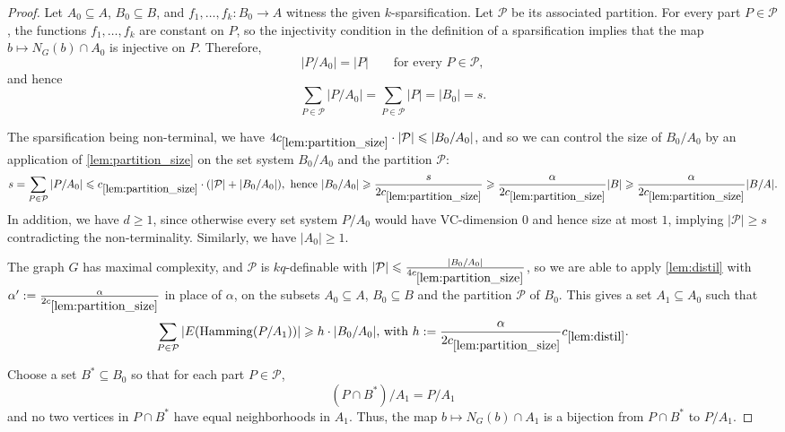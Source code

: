 \documentclass[11pt]{article}
\theoremstyle{definition}
\newcommand{\inducedSS}[2]{#1/#2}%
\renewcommand{\le}{\leqslant}
\renewcommand{\ge}{\geqslant}
\newcommand{\from}{\colon}
\renewcommand{\cal}{\mathcal}
\newcommand{\Pp}{\mathcal{P}}
\newcommand{\hamming}{\mathrm{Hamming}}
\begin{document}
\begin{proof}
Let $A_0\subseteq A$, $B_0\subseteq B$, and $f_1,\ldots,f_k\from B_0\to A$
witness the given $k$-sparsification.
Let $\cal P$ be its associated partition.
For every part $P\in\cal P$, the functions $f_1,\ldots,f_k$ are constant on $P$,
so the injectivity condition in the definition of a sparsification implies that
the map $b\mapsto N_G(b)\cap A_0$ is injective on $P$.
Therefore,
\[
  |\inducedSS{P}{A_0}|=|P|
  \qquad\text{for every }P\in\cal P,
\]
and hence
\[
  \sum_{P\in\cal P}|\inducedSS{P}{A_0}|=\sum_{P\in\cal P}|P|=|B_0|=s.
\]

The sparsification being non-terminal, we have $4 c_{\ref{lem:partition_size}} \cdot |\Pp| \le |\inducedSS{B_0}{A_0}|$, and so we can control the size of $\inducedSS{B_0}{A_0}$ by an application of \cref{lem:partition_size} on the set system $\inducedSS{B_0}{A_0}$ and the partition $\Pp$:
\[s = \sum_{P \in \Pp} |\inducedSS{P}{A_0}| \le c_{\ref{lem:partition_size}} \cdot (|\Pp| + |B_0/A_0|), \text{ hence } |\inducedSS{B_0}{A_0}| \ge \frac{s}{2 c_{\ref{lem:partition_size}}} \ge \frac{\alpha}{2 c_{\ref{lem:partition_size}}} |B| \ge \frac{\alpha}{2 c_{\ref{lem:partition_size}}} |\inducedSS{B}{A}|.
\]
\noindent In addition, we have $d\ge 1$, since otherwise every set system $\inducedSS{P}{A_0}$
would have VC-dimension $0$ and hence size at most $1$, implying $|\Pp| \ge s$ contradicting the non-terminality.
Similarly, we have $|A_0| \ge 1$.

The graph $G$ has maximal complexity, and $\Pp$ is $kq$-definable with $|\Pp| \le \frac{|\inducedSS{B_0}{A_0}|}{4 c_{\ref{lem:partition_size}}}$, so we are able to apply \cref{lem:distil} with $\alpha' := \frac{\alpha}{2 c_{\ref{lem:partition_size}}}$ in place of $\alpha$, on the subsets $A_0 \subseteq A$, $B_0 \subseteq B$ and the partition
$\cal P$ of $B_0$.
This gives a set $A_1\subseteq A_0$ such that
\begin{equation}\label{eq:step-many-hamming-edges}
  \sum_{P\in\cal P}|E(\hamming(\inducedSS{P}{A_1}))|
  \ge h \cdot |\inducedSS{B_0}{A_0}| \text{, with } h := \frac{\alpha}{2 c_{\ref{lem:partition_size}}} c_{\ref{lem:distil}}.
\end{equation}

Choose a set $B^*\subseteq B_0$ so that for each part $P\in\cal P$,
\[
  \inducedSS{(P\cap B^*)}{A_1}=\inducedSS{P}{A_1}
\]
and no two vertices in $P\cap B^*$ have equal neighborhoods in $A_1$.
Thus, the map $b\mapsto N_G(b)\cap A_1$ is a bijection from $P\cap B^*$ to
$\inducedSS{P}{A_1}$.


\end{proof}
\end{document}
